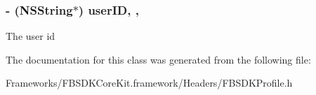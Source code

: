\subsubsection[{user\+I\+D}]{\setlength{\rightskip}{0pt plus 5cm}-\/ (N\+S\+String$\ast$) user\+I\+D\hspace{0.3cm}{\ttfamily [read]}, {\ttfamily [nonatomic]}, {\ttfamily [assign]}}\label{interface_f_b_s_d_k_profile_a26a7f698acf093c0d7e2be81532d1d67}
The user id 

The documentation for this class was generated from the following file\+:\begin{DoxyCompactItemize}
\item 
Frameworks/\+F\+B\+S\+D\+K\+Core\+Kit.\+framework/\+Headers/F\+B\+S\+D\+K\+Profile.\+h\end{DoxyCompactItemize}
